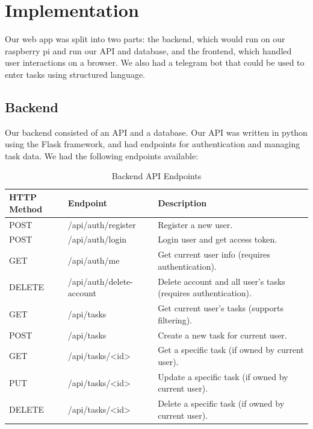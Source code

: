 \documentclass[11pt,oneside]{article}
\begin{document}
\section{Implementation}

Our web app was split into two parts: the backend, which would run on our raspberry pi and run our API and database, and the frontend, which handled user interactions on a browser. We also had a telegram bot that could be used to enter tasks using structured language.

\subsection{Backend}
Our backend consisted of an API and a database. Our API was written in python using the Flask framework, and had endpoints for authentication and managing task data. We had the following endpoints available:

\begin{table}[H]
    \centering
    \caption{Backend API Endpoints}
    \label{tab:api-endpoints}
    \begin{tabular}{l l p{8cm}}
        \toprule
        \textbf{HTTP Method} & \textbf{Endpoint} & \textbf{Description} \\
        \midrule
        POST & /api/auth/register & Register a new user. \\
        POST & /api/auth/login & Login user and get access token. \\
        GET & /api/auth/me & Get current user info (requires authentication). \\
        DELETE & /api/auth/delete-account & Delete account and all user's tasks (requires authentication). \\
        GET & /api/tasks & Get current user's tasks (supports filtering). \\
        POST & /api/tasks & Create a new task for current user. \\
        GET & /api/tasks/\textless id\textgreater & Get a specific task (if owned by current user). \\
        PUT & /api/tasks/\textless id\textgreater & Update a specific task (if owned by current user). \\
        DELETE & /api/tasks/\textless id\textgreater & Delete a specific task (if owned by current user). \\
        \bottomrule
    \end{tabular}
\end{table}
\end{document}
